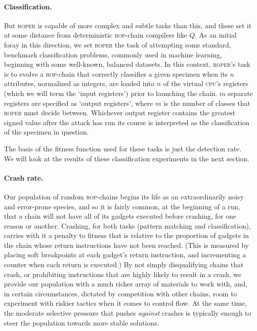 \paragraph{Classification.} But \textsc{roper} is capable of
more complex and subtle tasks than this, and these set it at some
distance from deterministic \textsc{rop}-chain compilers like
$Q$. As an initial foray in this direction, we set \textsc{roper}
the task of attempting some standard, benchmark classification
problems, commonly used in machine learning, beginning with some
well-known, balanced datasets. In this context, \textsc{roper}'s
task is to evolve a \textsc{rop}-chain that correctly classifies
a given specimen when its $n$ attributes, normalized as integers,
are loaded into $n$ of the virtual \textsc{cpu}'s registers
(which we will term the `input registers') prior to launching the
chain. $m$ separate registers are specified as `output
registers', where $m$ is the number of classes that
\textsc{roper} must decide between. Whichever output register
contains the greatest signed value after the attack has run its
course is interpreted as the classification of the specimen in
question. 

The basis of the fitness function used for these tasks
is just the detection rate. %
We will look at the results of these classification experiments
in the next section. 

\paragraph{Crash rate.} Our population of random
\textsc{rop}-chains begins its life as an extraordinarily noisy
and error-prone species, and so it is fairly common, at the
beginning of a run, that a chain will not have all of its gadgets
executed before crashing, for one reason or another. Crashing,
for both tasks (pattern matching and classification),
carries with it a penalty to fitness that is relative to the
proportion of gadgets in the chain whose return instructions have
not been reached. (This is measured by placing soft breakpoints at
each gadget's return instruction, and incrementing a counter when
each return is executed.) By not simply disqualifying chains that
crash, or prohibiting instructions that are highly likely to
result in a crash, we provide our population with a much richer
array of materials to work with, and, in certain circumstances,
dictated by competition with other chains, room to experiment
with riskier tactics when it comes to control flow. At the same
time, the moderate selective pressure that pushes \emph{against}
crashes is typically enough to steer the population towards
more stable solutions. 


